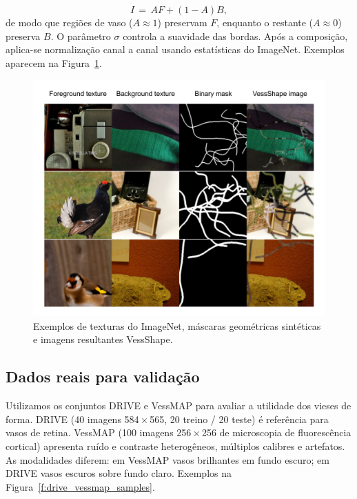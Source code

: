 \documentclass[%
reprint,
nofootinbib,
 amsmath,amssymb,
aps,
superscriptaddress,
showkeys,
longbibliography
]{revtex4-1}
\begin{document}
\begin{equation}
I \,=\, A F + (1-A) B,
\label{eq:compose}
\end{equation}
de modo que regiões de vaso ($A \approx 1$) preservam $F$, enquanto o restante ($A \approx 0$) preserva $B$. O parâmetro $\sigma$ controla a suavidade das bordas. Após a composição, aplica-se normalização canal a canal usando estatísticas do ImageNet. Exemplos aparecem na Figura~\ref{f:vessshape_sample}.

\begin{figure}[tbp]
    \centering
    \includegraphics[width=\columnwidth]{figures/results/vessshape_sample.pdf}
    \caption{Exemplos de texturas do ImageNet, máscaras geométricas sintéticas e imagens resultantes VessShape.}
    \label{f:vessshape_sample}
\end{figure}

\subsection{Dados reais para validação}

Utilizamos os conjuntos DRIVE e VessMAP para avaliar a utilidade dos vieses de forma. DRIVE (40 imagens 584\,$\times$\,565, 20 treino / 20 teste) é referência para vasos de retina. VessMAP (100 imagens 256\,$\times$\,256 de microscopia de fluorescência cortical) apresenta ruído e contraste heterogêneos, múltiplos calibres e artefatos. As modalidades diferem: em VessMAP vasos brilhantes em fundo escuro; em DRIVE vasos escuros sobre fundo claro. Exemplos na Figura~\ref{f:drive_vessmap_samples}.
\end{document}
